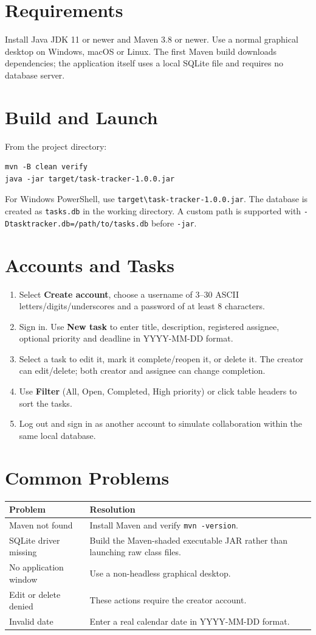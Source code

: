 \documentclass[11pt,a4paper]{article}
\begin{document}
\section{Requirements}
Install Java JDK 11 or newer and Maven 3.8 or newer. Use a normal graphical desktop on Windows, macOS or Linux. The first Maven build downloads dependencies; the application itself uses a local SQLite file and requires no database server.
\section{Build and Launch}
From the project directory:
\begin{verbatim}
mvn -B clean verify
java -jar target/task-tracker-1.0.0.jar
\end{verbatim}
For Windows PowerShell, use \texttt{target\textbackslash task-tracker-1.0.0.jar}. The database is created as \texttt{tasks.db} in the working directory. A custom path is supported with \texttt{-Dtasktracker.db=/path/to/tasks.db} before \texttt{-jar}.
\section{Accounts and Tasks}
\begin{enumerate}
\item Select \textbf{Create account}, choose a username of 3--30 ASCII letters/digits/underscores and a password of at least 8 characters.
\item Sign in. Use \textbf{New task} to enter title, description, registered assignee, optional priority and deadline in YYYY-MM-DD format.
\item Select a task to edit it, mark it complete/reopen it, or delete it. The creator can edit/delete; both creator and assignee can change completion.
\item Use \textbf{Filter} (All, Open, Completed, High priority) or click table headers to sort the tasks.
\item Log out and sign in as another account to simulate collaboration within the same local database.
\end{enumerate}
\section{Common Problems}
\begin{tabularx}{\linewidth}{p{53mm}X}
\toprule Problem & Resolution \\ \midrule
Maven not found & Install Maven and verify \texttt{mvn -version}.\\
SQLite driver missing & Build the Maven-shaded executable JAR rather than launching raw class files.\\
No application window & Use a non-headless graphical desktop.\\
Edit or delete denied & These actions require the creator account.\\
Invalid date & Enter a real calendar date in YYYY-MM-DD format.\\
\bottomrule
\end{tabularx}
\end{document}

